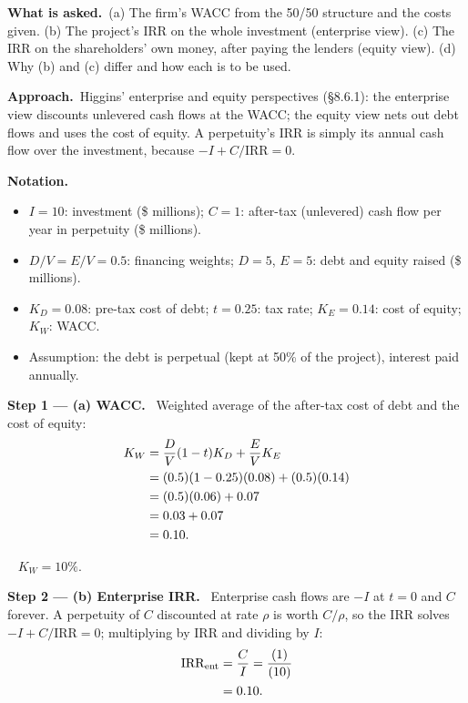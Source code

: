 \documentclass[11pt,a4paper]{article}
\numberwithin{equation}{section}
\newcommand{\step}[2]{\par\medskip\noindent\textbf{Step #1 --- #2.}~}
\newenvironment{notation}{\par\noindent\textbf{Notation.}\begin{itemize}[leftmargin=1.4em]}{\end{itemize}}
\newcommand{\asked}{\par\medskip\noindent\textbf{What is asked.}~}
\newcommand{\approach}{\par\smallskip\noindent\textbf{Approach.}~}
\newcommand{\answer}[1]{\par\smallskip\noindent\fbox{\textbf{Answer #1.}}~}
\begin{document}
\asked (a) The firm's WACC from the 50/50 structure and the costs given. (b) The project's IRR on
the whole investment (enterprise view). (c) The IRR on the shareholders' own money, after paying
the lenders (equity view). (d) Why (b) and (c) differ and how each is to be used.

\approach Higgins' enterprise and equity perspectives (\S8.6.1): the enterprise view discounts
unlevered cash flows at the WACC; the equity view nets out debt flows and uses the cost of
equity. A perpetuity's IRR is simply its annual cash flow over the investment, because
$-I+C/\mathrm{IRR}=0$.

\begin{notation}
  \item $I=10$: investment (\$ millions); $C=1$: after-tax (unlevered) cash flow per year in perpetuity (\$ millions).
  \item $D/V=E/V=0.5$: financing weights; $D=5$, $E=5$: debt and equity raised (\$ millions).
  \item $K_D=0.08$: pre-tax cost of debt; $t=0.25$: tax rate; $K_E=0.14$: cost of equity; $K_W$: WACC.
  \item Assumption: the debt is perpetual (kept at 50\% of the project), interest paid annually.
\end{notation}

\step{1}{(a) WACC} Weighted average of the after-tax cost of debt and the cost of equity:
\begin{align}
  K_W &= \frac{D}{V}(1-t)K_D + \frac{E}{V}K_E \notag\\
      &= (0.5)(1-0.25)(0.08) + (0.5)(0.14) \notag\\
      &= (0.5)(0.06) + 0.07 \notag\\
      &= 0.03 + 0.07 \notag\\
      &= 0.10. \label{eq:10kw}
\end{align}

\answer{(a)} $K_W=10\%$.

\step{2}{(b) Enterprise IRR} Enterprise cash flows are $-I$ at $t=0$ and $C$ forever. A perpetuity
of $C$ discounted at rate $\rho$ is worth $C/\rho$, so the IRR solves $-I + C/\mathrm{IRR}=0$;
multiplying by $\mathrm{IRR}$ and dividing by $I$:
\begin{align}
  \mathrm{IRR}_{\mathrm{ent}} &= \frac{C}{I} = \frac{(1)}{(10)} \notag\\
                              &= 0.10. \label{eq:10ent}
\end{align}
\end{document}
